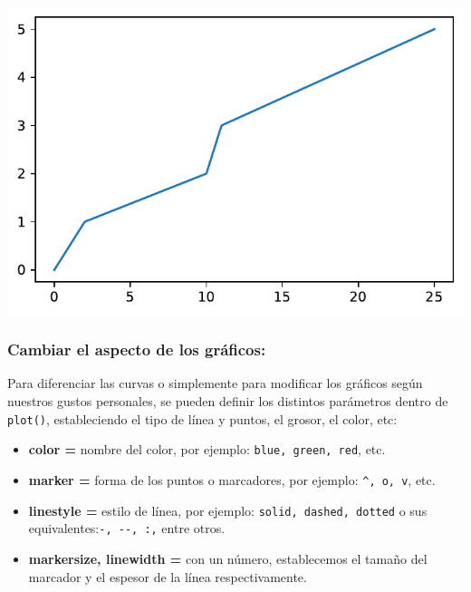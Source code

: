 \documentclass[
  letterpaper,
  DIV=11,
  numbers=noendperiod]{scrreprt}
\providecommand{\tightlist}{%
  \setlength{\itemsep}{0pt}\setlength{\parskip}{0pt}}\usepackage{longtable,booktabs,array}
\begin{document}
\includegraphics{unidad_6_files/figure-pdf/cell-110-output-1.pdf}

\subsubsection{Cambiar el aspecto de los
gráficos:}\label{cambiar-el-aspecto-de-los-gruxe1ficos}

Para diferenciar las curvas o simplemente para modificar los gráficos
según nuestros gustos personales, se pueden definir los distintos
parámetros dentro de \texttt{plot()}, estableciendo el tipo de línea y
puntos, el grosor, el color, etc:

\begin{itemize}
\tightlist
\item
  \textbf{color =} nombre del color, por ejemplo:
  \texttt{\textquotesingle{}blue\textquotesingle{},\ \textquotesingle{}green\textquotesingle{},\ \textquotesingle{}red\textquotesingle{}},
  etc.
\item
  \textbf{marker =} forma de los puntos o marcadores, por ejemplo:
  \texttt{\textquotesingle{}\^{}\textquotesingle{},\ \textquotesingle{}o\textquotesingle{},\ \textquotesingle{}v\textquotesingle{}},
  etc.
\item
  \textbf{linestyle =} estilo de línea, por ejemplo:
  \texttt{\textquotesingle{}solid\textquotesingle{},\ \textquotesingle{}dashed\textquotesingle{},\ \textquotesingle{}dotted\textquotesingle{}}
  o sus
  equivalentes:\texttt{\textquotesingle{}-\textquotesingle{},\ \textquotesingle{}-\/-\textquotesingle{},\ \textquotesingle{}:\textquotesingle{},}
  entre otros.
\item
  \textbf{markersize, linewidth =} con un número, establecemos el tamaño
  del marcador y el espesor de la línea respectivamente.
\end{itemize}
\end{document}
